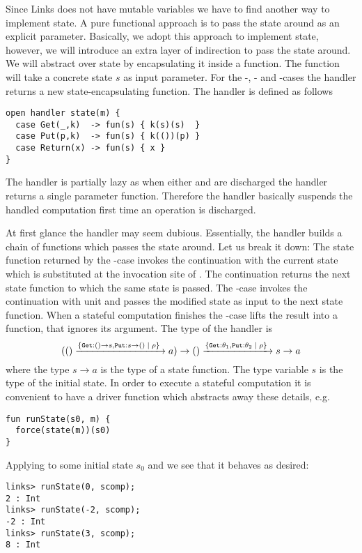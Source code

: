\begin{example}\label{ex:state}
Since Links does not have mutable variables we have to find another way to implement state. A pure functional approach is to pass the state around as an explicit parameter.
Basically, we adopt this approach to implement state, however, we will introduce an extra layer of indirection
to pass the state around. We will abstract over state by encapsulating it inside a function. The function will take a concrete state $s$ as input parameter. For the -, - and -cases the handler returns a new state-encapsulating function. The  handler is defined as follows
\begin{lstlisting}[style=links]
open handler state(m) {
  case Get(_,k)  -> fun(s) { k(s)(s)  }
  case Put(p,k)  -> fun(s) { k(())(p) }
  case Return(x) -> fun(s) { x }
}
\end{lstlisting}
The  handler is partially lazy as when either  and  are discharged the handler returns a single parameter function. Therefore the handler basically suspends the handled computation first time an operation is discharged.

At first glance the  handler may seem dubious. Essentially, the handler builds a chain of functions which passes the state around. Let us break it down: The state function returned by the -case invokes the continuation with the current state which is substituted at the invocation site of . The continuation returns the next state function to which the same state is passed.
The -case invokes the continuation with unit and passes the modified state  as input to the next state function.
When a stateful computation finishes the -case lifts the result into a function, that ignores its argument. The type of the  handler is 
\[ 
(() \xrightarrow{ \{ \texttt{Get}: () \to s, \texttt{Put}: s \to () \; | \; \rho\}\;} a) \to () \xrightarrow{ \{\texttt{Get}:\theta_1, \texttt{Put}:\theta_2 \; | \; \rho\}\;} s \to a 
\]
where the type $s \to a$ is the type of a state function. The type variable $s$ is the type of the initial state. In order to execute a stateful computation it is convenient to have a driver function  which abstracts away these details, e.g.
\begin{lstlisting}[style=links]
fun runState(s0, m) {
  force(state(m))(s0)
}
\end{lstlisting}
Applying  to some initial state $s_0$ and  we see that it behaves as desired:
\begin{lstlisting}[style=links]
links> runState(0, scomp);
2 : Int
links> runState(-2, scomp);
-2 : Int
links> runState(3, scomp);
8 : Int
\end{lstlisting}
\end{example}
